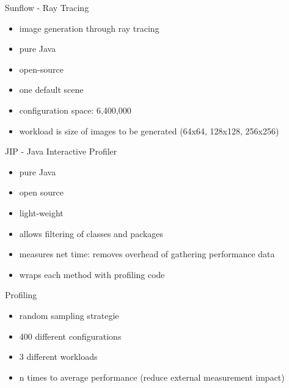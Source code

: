 \documentclass[11pt,aspectratio=169]{beamer}
\begin{document}
\begin{frame}{Sunflow - Ray Tracing}
  \begin{itemize}
    \item image generation through ray tracing
    \item pure Java
    \item open-source
    \item one default scene
    \item configuration space: 6,400,000
    \item workload is size of images to be generated (64x64, 128x128, 256x256)
  \end{itemize}
\end{frame}


\begin{frame}{JIP - Java Interactive Profiler}
  \begin{itemize}
    \item pure Java
    \item open source
    \item light-weight
    \item allows filtering of classes and packages
    \item measures net time: removes overhead of gathering performance data
    \item wraps each method with profiling code
  \end{itemize}
\end{frame}

\begin{frame}{Profiling}
  \begin{itemize}
    \item random sampling strategie
    \item 400 different configurations
    \item 3 different workloads
    \item n times to average performance (reduce external measurement impact)
  \end{itemize}
\end{frame}

\end{document}
